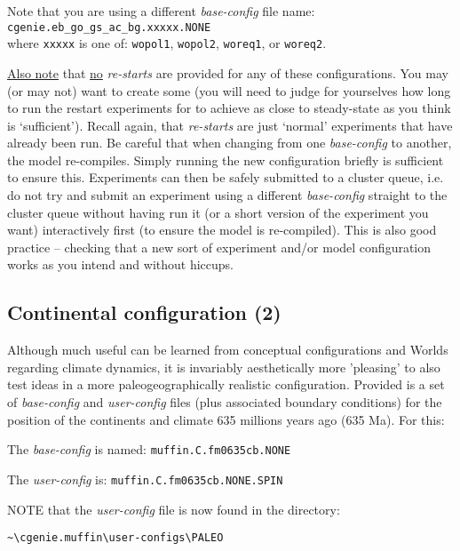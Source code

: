 \documentclass[11pt,fleqn]{book} %
\begin{document}
Note that you are using a different \textit{base-config} file name: \small\texttt{cgenie.eb\_go\_gs\_ac\_bg.xxxxx.NONE}\normalsize \\where \texttt{xxxxx} is one of: \texttt{wopol1}, \texttt{wopol2}, \texttt{woreq1}, or \texttt{woreq2}.

\uline{Also note} that \uline{no} \textit{re-starts} are provided for any of these configurations. You may (or may not) want to create some (you will need to judge for yourselves how long to run the restart experiments for to achieve as close to steady-state as you think is ‘sufficient’). Recall again, that \textit{re-starts} are just ‘normal’ experiments that have already been run.
Be careful that when changing from one \textit{base-config} to another, the model re-compiles. Simply running the new configuration briefly is sufficient to ensure this. Experiments can then be safely submitted to a cluster queue, i.e. do not try and submit an experiment using a different \textit{base-config} straight to the cluster queue without having run it (or a short version of the experiment you want) interactively first (to ensure the model is re-compiled). This is also good practice – checking that a new sort of experiment and/or model configuration works as you intend and without hiccups.


\subsection{Continental configuration (2)}

Although much useful can be learned from conceptual configurations and Worlds regarding climate dynamics, it is invariably aesthetically more 'pleasing' to also test ideas in a more paleogeographically realistic configuration. Provided is a set of \textit{base-config} and \textit{user-config} files (plus associated boundary conditions) for the position of the continents and climate 635 millions years ago (635 Ma). For this:

The \textit{base-config} is named: \texttt{muffin.C.fm0635cb.NONE}

The \textit{user-config} is: \texttt{muffin.C.fm0635cb.NONE.SPIN}

NOTE that the \textit{user-config} file is now found in the directory:

\vspace{-2mm}
\begin{verbatim}
~\cgenie.muffin\user-configs\PALEO
\end{verbatim}
\vspace{-2mm}
\end{document}
